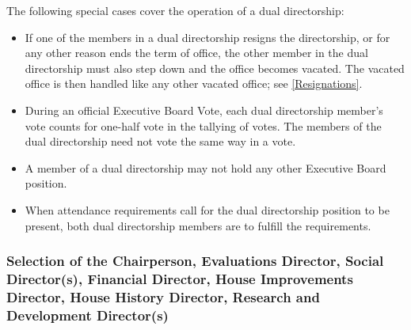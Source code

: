 \documentclass{article}
\newcommand{\asubsection}[1]{\subsubsection{#1} \label{#1}}
\begin{document}
The following special cases cover the operation of a dual directorship:
\begin{itemize}
	\item If one of the members in a dual directorship resigns the directorship, or for any other reason ends the term of office, the other member in the dual directorship must also step down and the office becomes vacated.
		The vacated office is then handled like any other vacated office; see \ref{Resignations}.
	\item During an official Executive Board Vote, each dual directorship member's vote counts for one-half vote in the tallying of votes.
		The members of the dual directorship need not vote the same way in a vote.
	\item A member of a dual directorship may not hold any other Executive Board position.
	\item When attendance requirements call for the dual directorship position to be present, both dual directorship members are to fulfill the requirements.
\end{itemize}
\asubsection{Selection of the Chairperson, Evaluations Director, Social Director(s), Financial Director, House Improvements Director, House History Director, Research and Development Director(s)}
\end{document}
